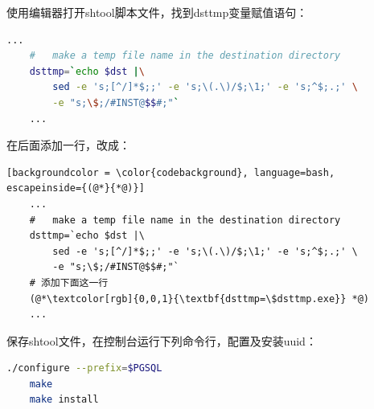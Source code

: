 使用编辑器打开shtool脚本文件，找到dsttmp变量赋值语句：
\begin{lstlisting}[backgroundcolor = \color{codebackground}, language=bash]
	...
	#   make a temp file name in the destination directory
	dsttmp=`echo $dst |\
		sed -e 's;[^/]*$;;' -e 's;\(.\)/$;\1;' -e 's;^$;.;' \
		-e "s;\$;/#INST@$$#;"`
	...
\end{lstlisting}

在后面添加一行，改成：

\begin{lstlisting}[backgroundcolor = \color{codebackground}, language=bash, escapeinside={(@*}{*@)}]
	...
	#   make a temp file name in the destination directory
	dsttmp=`echo $dst |\
		sed -e 's;[^/]*$;;' -e 's;\(.\)/$;\1;' -e 's;^$;.;' \
		-e "s;\$;/#INST@$$#;"`
	# 添加下面这一行
	(@*\textcolor[rgb]{0,0,1}{\textbf{dsttmp=\$dsttmp.exe}} *@)
	...
\end{lstlisting}

保存shtool文件，在控制台运行下列命令行，配置及安装uuid：

\begin{lstlisting}[backgroundcolor = \color{codebackground}, language=bash]
	./configure --prefix=$PGSQL
	make 
	make install
\end{lstlisting}

